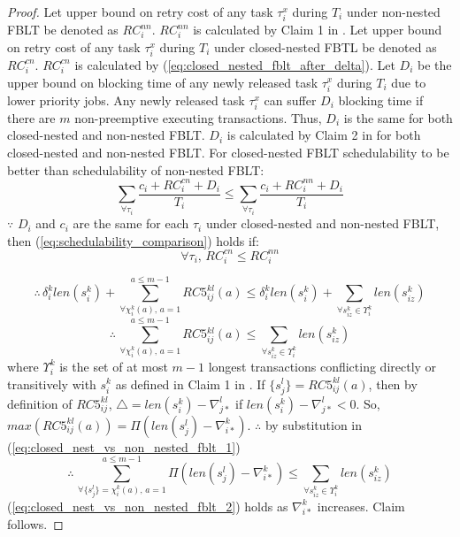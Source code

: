 \documentclass[10pt, conference, compsocconf]{IEEEtran}
\begin{document}
\begin{proof}

Let upper bound on retry cost of any task $\tau_{i}^{x}$ during $T_{i}$
under non-nested FBLT be denoted as $RC_{i}^{nn}$. $RC_{i}^{nn}$
is calculated by Claim 1 in \cite{fblt}. Let upper bound on retry
cost of any task $\tau_{i}^{x}$ during $T_{i}$ under closed-nested
FBTL be denoted as $RC_{i}^{cn}$. $RC_{i}^{cn}$ is calculated by
(\ref{eq:closed_nested_fblt_after_delta}). Let $D_{i}$ be the upper
bound on blocking time of any newly released task $\tau_{i}^{x}$
during $T_{i}$ due to lower priority jobs. Any newly released task
$\tau_{i}^{x}$ can suffer $D_{i}$ blocking time if there are $m$
non-preemptive executing transactions. Thus, $D_{i}$ is the same
for both closed-nested and non-nested FBLT. $D_{i}$ is calculated
by Claim 2 in \cite{fblt} for both closed-nested and non-nested FBLT.
For closed-nested FBLT schedulability to be better than schedulability
of non-nested FBLT: 
\begin{equation}
\sum_{\forall\tau_{i}}\frac{c_{i}+RC_{i}^{cn}+D_{i}}{T_{i}}\le\sum_{\forall\tau_{i}}\frac{c_{i}+RC_{i}^{nn}+D_{i}}{T_{i}}\label{eq:schedulability_comparison}
\end{equation}
$\because$ $D_{i}$ and $c_{i}$ are the same for each $\tau_{i}$
under closed-nested and non-nested FBLT, then (\ref{eq:schedulability_comparison})
holds if:
\[
\forall\tau_{i},\, RC_{i}^{cn}\le RC_{i}^{nn}
\]


\[
\therefore\,\delta_{i}^{k}len\left(s_{i}^{k}\right)+\sum_{\forall\chi_{i}^{k}(a),\, a=1}^{a\le m-1}RC5_{ij}^{kl}(a)\le\delta_{i}^{k}len\left(s_{i}^{k}\right)+\sum_{\forall s_{iz}^{k}\in\Upsilon_{i}^{k}}len\left(s_{iz}^{k}\right)
\]
\begin{equation}
\therefore\,\sum_{\forall\chi_{i}^{k}(a),\, a=1}^{a\le m-1}RC5{}_{ij}^{kl}(a)\le\sum_{\forall s_{iz}^{k}\in\Upsilon_{i}^{k}}len\left(s_{iz}^{k}\right)\label{eq:closed_nest_vs_non_nested_fblt_1}
\end{equation}
where $\Upsilon_{i}^{k}$ is the set of at most $m-1$ longest transactions
conflicting directly or transitively with $s_{i}^{k}$ as defined
in Claim 1 in \cite{fblt}. If $\{s_{j}^{l}\}=RC5_{ij}^{kl}(a)$,
then by definition of $RC5_{ij}^{kl}$, $\triangle=len(s_{i}^{k})-\nabla_{j*}^{l}$
if $len(s_{i}^{k})-\nabla_{j*}^{l}<0$. So, $max\left(RC5_{ij}^{kl}(a)\right)=\Pi\left(len(s_{j}^{l})-\nabla_{i*}^{k}\right)$.
$\therefore$ by substitution in (\ref{eq:closed_nest_vs_non_nested_fblt_1})
\begin{equation}
\therefore\,\sum_{\forall\{s_{j}^{l}\}=\chi_{i}^{k}(a),\, a=1}^{a\le m-1}\Pi\left(len(s_{j}^{l})-\nabla_{i*}^{k}\right)\le\sum_{\forall s_{iz}^{k}\in\Upsilon_{i}^{k}}len\left(s_{iz}^{k}\right)\label{eq:closed_nest_vs_non_nested_fblt_2}
\end{equation}
(\ref{eq:closed_nest_vs_non_nested_fblt_2}) holds as $\nabla_{i*}^{k}$
increases. Claim follows.

\end{proof}
\end{document}
